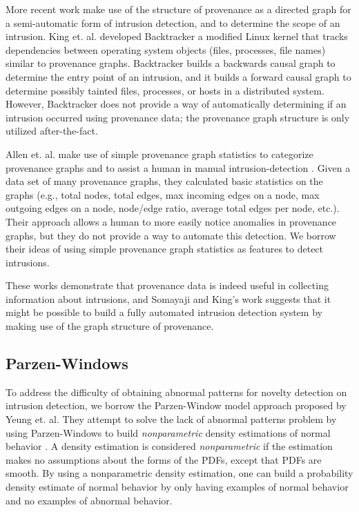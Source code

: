 \documentclass[10pt,twocolumn]{article}
\begin{document}
More recent work make use of the structure of provenance as a directed graph for a semi-automatic form
of intrusion detection, and to determine the scope of an intrusion. King et. al. developed Backtracker \cite{backtracker}
 a modified
Linux kernel that tracks dependencies between operating system objects (files, processes, file names) similar
to provenance graphs. Backtracker builds a backwards causal graph to determine the entry point of an intrusion,
and it builds a forward causal graph to determine possibly tainted files, processes, or hosts in a distributed
system. However, Backtracker does not provide a way of automatically determining if an intrusion occurred
using provenance data; the provenance graph structure is only utilized after-the-fact.

Allen et. al. make use of simple provenance graph statistics to categorize provenance graphs and to assist a human
in manual intrusion-detection \cite{provstat}. Given a data set of many provenance graphs, they calculated basic statistics
on the graphs (e.g., total nodes, total edges, max incoming edges on a node, max outgoing edges on a node,
node/edge ratio, average total edges per node, etc.). Their approach allows a human to more easily
notice anomalies in provenance graphs, but they do not provide a way to automate this detection.
We borrow their ideas of using simple provenance graph statistics as features to detect intrusions.

These works demonstrate that provenance data is indeed useful in collecting information about intrusions, and
Somayaji and King's work suggests that it might be possible to build a fully automated intrusion detection
system by making use of the graph structure of provenance.

\subsection{Parzen-Windows}

To address the difficulty of obtaining abnormal patterns for novelty detection on intrusion detection, we borrow
the Parzen-Window model approach proposed by Yeung et. al.
They attempt to solve the lack of abnormal patterns problem by using Parzen-Windows to build {\em nonparametric}
density estimations of normal behavior \cite{parzen}. A density estimation is considered {\em nonparametric} if the estimation
makes no assumptions about the forms of the PDFs, except that PDFs are smooth. By using a nonparametric
density estimation, one can build a probability density estimate of normal behavior by only having examples of normal
behavior and no examples of abnormal behavior.
\end{document}
